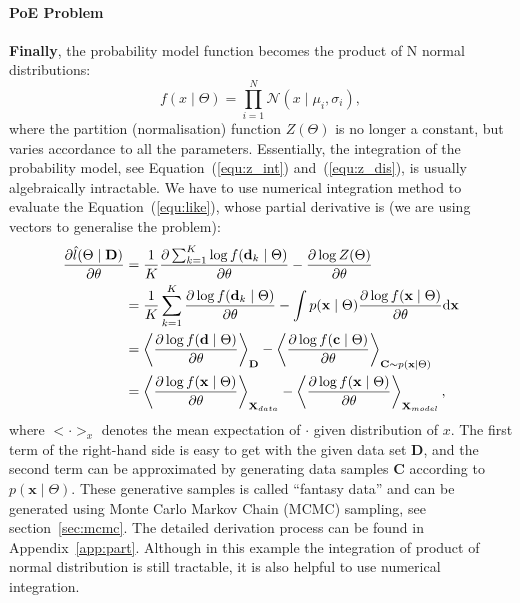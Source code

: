 \paragraph{PoE Problem} 
\textbf{Finally}, the probability model function becomes the product of N normal distributions: 
\begin{equation}
f(x \mid \Theta ) = \prod_{i=1}^N\mathcal{N}(x \mid \mu_i, \sigma_i ),
\end{equation}
where the partition (normalisation) function $Z( \Theta)$ is no longer a constant, but varies accordance to all the parameters.
Essentially, the integration of the probability model, see Equation~(\ref{equ:z_int}) and~(\ref{equ:z_dis}), is usually algebraically intractable.
We have to use numerical integration method to evaluate the Equation~(\ref{equ:like}), whose partial derivative is (we are using vectors to generalise the problem):
\begin{equation}
\label{equ:part}
\begin{aligned}
\dfrac{\partial \hat{l} (\Theta \mid \mathbf{D})}{\partial \theta} 
& = \frac{1}{K} \dfrac{\partial \sum_{k=1}^K\log f(\mathbf{d}_k \mid \Theta )}{\partial \theta} - \dfrac{\partial \log Z( \Theta)}{\partial \theta}\\
& =  \frac{1}{K}\sum_{k=1}^K \dfrac{\partial \log f(\mathbf{d}_k \mid \Theta)}{\partial \theta} - \int p(\mathbf{x} \mid \Theta) \dfrac{\partial \log f(\mathbf{x} \mid \Theta)}{\partial \theta} \mathrm{d} \mathbf{x}\\
& = \left \langle \dfrac{\partial \log f(\mathbf{d} \mid \Theta)}{\partial \theta}\right \rangle_{\mathbf{D}} -\left \langle \dfrac{\partial \log f(\mathbf{c} \mid \Theta)}{\partial \theta}\right \rangle_{\mathbf{C} \sim p(\mathbf{x} \mid \Theta)}  \\
&=\left \langle \dfrac{\partial \log f(\mathbf{x} \mid \Theta)}{\partial \theta}\right \rangle_{\mathbf{X}_{data}} - \left \langle \dfrac{\partial \log f(\mathbf{x} \mid \Theta)}{\partial \theta}\right \rangle_{\mathbf{X}_{model}},
\end{aligned}
\end{equation}
where  $ <\cdot>_x $ denotes the mean expectation of $ \cdot $ given distribution of $x$.
The first term of the right-hand side is easy to get with the given data set $ \mathbf{D} $, and the second term can be approximated by generating data samples $ \mathbf{C} $ according to $ p(\mathbf{x} \mid \Theta) $.
These generative samples is called ``fantasy data'' and can be generated using Monte Carlo Markov Chain (MCMC) sampling, see section~\ref{sec:mcmc}.
The detailed derivation process can be found in Appendix~\ref{app:part}.
Although in this example the integration of product of normal distribution is still tractable, it is also helpful to use numerical integration.

